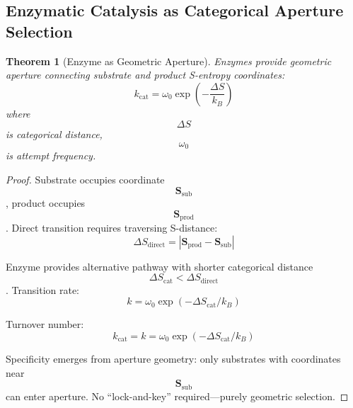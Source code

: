 \documentclass[11pt,twocolumn,a4paper]{article}
\newtheorem{theorem}{Theorem}[section]
\theoremstyle{remark}
\begin{document}
\subsection{Enzymatic Catalysis as Categorical Aperture Selection}

\begin{theorem}[Enzyme as Geometric Aperture]
\label{thm:enzyme_aperture}
Enzymes provide geometric aperture connecting substrate and product S-entropy coordinates:
$$
k_{\mathrm{cat}} = \omega_0 \exp\left(-\frac{\Delta S}{k_B}\right)
$$
where $$\Delta S$$ is categorical distance, $$\omega_0$$ is attempt frequency.
\end{theorem}

\begin{proof}
Substrate occupies coordinate $$\mathbf{S}_{\mathrm{sub}}$$, product occupies $$\mathbf{S}_{\mathrm{prod}}$$. Direct transition requires traversing S-distance:
$$
\Delta S_{\mathrm{direct}} = |\mathbf{S}_{\mathrm{prod}} - \mathbf{S}_{\mathrm{sub}}|
$$

Enzyme provides alternative pathway with shorter categorical distance $$\Delta S_{\mathrm{cat}} < \Delta S_{\mathrm{direct}}$$. Transition rate:
$$
k = \omega_0 \exp(-\Delta S_{\mathrm{cat}}/k_B)
$$

Turnover number:
$$
k_{\mathrm{cat}} = k = \omega_0 \exp(-\Delta S_{\mathrm{cat}}/k_B)
$$

Specificity emerges from aperture geometry: only substrates with coordinates near $$\mathbf{S}_{\mathrm{sub}}$$ can enter aperture. No ``lock-and-key'' required---purely geometric selection.
\end{proof}
\end{document}

